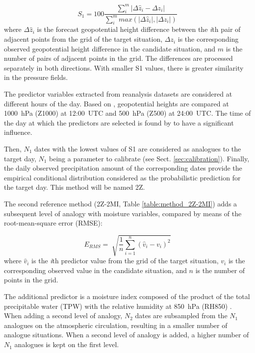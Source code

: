 \documentclass[hess, manuscript]{copernicus}
\begin{document}
	\begin{equation}
	\label{eq:S1}
	S_{1}=100 \frac {\displaystyle \sum_{i}^{m} \vert \Delta\hat{z}_{i} - \Delta z_{i} \vert}
	{\displaystyle \sum_{i}^{m} max( \vert \Delta\hat{z}_{i} \vert , \vert \Delta z_{i} \vert ) }
	\end{equation}
	where $\Delta \hat{z}_{i}$ is the forecast geopotential height difference between the \textit{i}th pair of adjacent points from the grid of the target situation, $\Delta z_{i}$ is the corresponding observed geopotential height difference in the candidate situation, and $m$ is the number of pairs of adjacent points in the grid. The differences are processed separately in both directions. With smaller S1 values, there is greater similarity in the pressure fields.
	
	The predictor variables extracted from reanalysis datasets are considered at different hours of the day. Based on \citet{Bontron2005}, geopotential heights are compared at 1000~hPa (Z1000) at 12:00~UTC and 500~hPa (Z500) at 24:00~UTC. The time of the day at which the predictors are selected is found by \citet{Bontron2004} to have a significant influence.
	
	Then, $N_{1}$ dates with the lowest values of S1 are considered as analogues to the target day, $N_{1}$ being a parameter to calibrate (see Sect. \ref{sec:calibration}). Finally, the daily observed precipitation amount of the corresponding dates provide the empirical conditional distribution considered as the probabilistic prediction for the target day. This method will be named 2Z.
	
	The second reference method (2Z-2MI, Table \ref{table:method_2Z-2MI}) adds a subsequent level of analogy with moisture variables, compared by means of the root-mean-square error (RMSE):
	
	\begin{equation}
	\label{eq:RMSE}
	E_{RMS}= \sqrt[]{ \frac{1}{n} \sum_{i=1}^{n}(\hat{v}_{i} - v_{i})^{2}} 
	\end{equation}
	where $\hat{v}_{i}$ is the \textit{i}th predictor value from the grid of the target situation, $v_{i}$ is the corresponding observed value in the candidate situation, and $n$ is the number of points in the grid.
	
	The additional predictor is a moisture index composed of the product of the total precipitable water (TPW) with the relative humidity at 850~hPa (RH850) \citep{Bontron2004}. When adding a second level of analogy, $N_{2}$ dates are subsampled from the $N_{1}$ analogues on the atmospheric circulation, resulting in a smaller number of analogue situations. When a second level of analogy is added, a higher number of $N_{1}$ analogues is kept on the first level.
	
\end{document}
